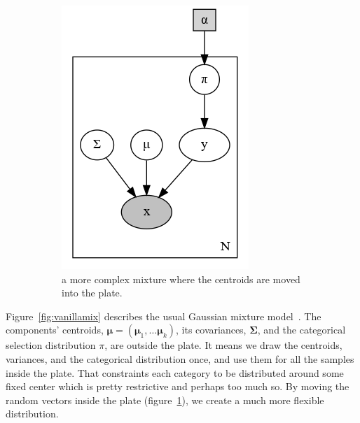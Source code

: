 \documentclass[11pt, a4paper]{report}
\theoremstyle{plain}
\theoremstyle{definition}
\theoremstyle{remark}
\newcommand{\bv}[1]{\boldsymbol{#1}}
\begin{document}
\begin{figure}[!h]
\begin{framed}
\begin{subfigure}[t]{0.4\textwidth}
\includegraphics[width=\textwidth]{plots/mmp.gv.png}
\caption{a more complex mixture where the centroids are moved into the plate.}
\label{fig:platemix}
\end{subfigure}
\caption{}
\label{fig:mixturemodels}
\end{framed}
\end{figure}

Figure~\ref{fig:vanillamix} describes the usual Gaussian mixture
model~\cite{bishop2006pattern}. The components'
centroids, $\bv{\mu} = (\bv{\mu}_1, \dots \bv{\mu}_k)$, its covariances,
$\bv{\Sigma}$, 
and the categorical selection
distribution $\pi$, are outside the plate.
It means we draw the centroids, variances, and the categorical distribution
once, and use them for all the samples inside the plate.
That constraints each category to be
distributed around some fixed center which is pretty restrictive and perhaps too
much so. By moving the random vectors inside the plate
(figure~\ref{fig:platemix}), we create a much more flexible distribution.
\end{document}
